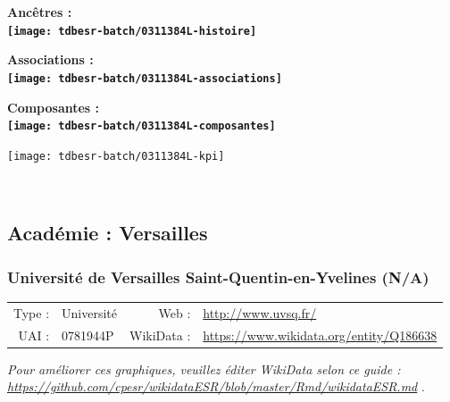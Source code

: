 \documentclass[12pt,french,]{article}
\begin{document}
\vspace{1cm}  
\begin{minipage}[b]{0.50\textwidth}\begin{center} \bf Ancêtres : \\  
\texttt{[image: tdbesr-batch/0311384L-histoire]} \end{center}\end{minipage}\begin{minipage}[b]{0.50\textwidth}\begin{center} \bf Associations : \\  
\texttt{[image: tdbesr-batch/0311384L-associations]} \end{center}\end{minipage}

\hrulefill

\begin{center} \bf Composantes : \\  
\texttt{[image: tdbesr-batch/0311384L-composantes]} \end{center}

\begin{center}\texttt{[image: tdbesr-batch/0311384L-kpi]} \end{center}\checkoddpage

\ifoddpage \fi ~\newpage  

\hypertarget{acaduxe9mie-versailles}{%
\subsection{Académie : Versailles}\label{acaduxe9mie-versailles}}

\hypertarget{universituxe9-de-versailles-saint-quentin-en-yvelines-na}{%
\subsubsection{Université de Versailles Saint-Quentin-en-Yvelines
(N/A)}\label{universituxe9-de-versailles-saint-quentin-en-yvelines-na}}

\begin{tabular*}{\textwidth}{rp{5cm}rl}  
\hline  
Type : & Université & Web : &\href{http://www.uvsq.fr/}{http://www.uvsq.fr/} \\  
UAI : & 0781944P & WikiData : & \href{https://www.wikidata.org/entity/Q186638}{https://www.wikidata.org/entity/Q186638} \\  
\hline  
\end{tabular*}

\textit{\scriptsize Pour améliorer ces graphiques, veuillez éditer WikiData selon ce guide :  \href{https://github.com/cpesr/wikidataESR/blob/master/Rmd/wikidataESR.md}{https://github.com/cpesr/wikidataESR/blob/master/Rmd/wikidataESR.md}}
.
\end{document}
